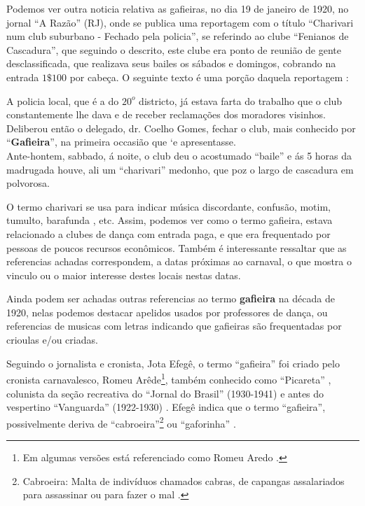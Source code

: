Podemos ver outra noticia relativa as gafieiras, no dia 19 de janeiro de 1920, 
no jornal ``A Razão'' (RJ), onde se
publica uma reportagem com o título 
``Charivari num club suburbano - Fechado pela policia'',
se referindo ao clube ``Fenianos de Cascadura'',
que seguindo o descrito, este clube era 
ponto de reunião de gente desclassificada, 
que realizava seus bailes os sábados e domingos,
cobrando na entrada $1\$100$ por cabeça.
O seguinte texto é uma porção daquela reportagem \cite[pp. 4]{oldgafieira4} \cite[pp. 629]{spielmann2016reflexoes}:
\begin{citando}
A policia local, que é a do $20^o$ districto,
já estava farta do trabalho que o club 
constantemente lhe dava e de receber reclamações 
dos moradores visinhos.\\
Deliberou então o delegado, dr. Coelho
Gomes, fechar o club, mais conhecido por 
``\textbf{Gafieira}'', na primeira occasião que `e apresentasse.\\
Ante-hontem, sabbado, á noite, o club 
deu o acostumado ``baile'' e ás 5 horas da 
madrugada houve, ali um ``charivari'' medonho,
que poz o largo de cascadura em polvorosa. 
\end{citando}
O termo charivari se usa para indicar música discordante, 
confusão, motim, tumulto, barafunda \cite[pp. 53]{almeida1996dicionario}, etc.
Assim, podemos ver como o termo gafieira, 
estava relacionado a clubes de dança com entrada paga,
e que era frequentado por pessoas de poucos recursos econômicos. 
Também é interessante ressaltar que as referencias achadas correspondem,
a datas próximas ao carnaval, o que mostra o vinculo ou o maior interesse 
destes locais nestas datas. 

Ainda podem ser achadas outras referencias ao termo \textbf{gafieira} na década de 1920,
nelas podemos destacar apelidos usados por professores de dança,
ou referencias de musicas com letras indicando que gafieiras 
são frequentadas por crioulas e/ou criadas.



Seguindo o  jornalista e cronista, Jota Efegê, %
o termo ``gafieira'' foi criado pelo cronista carnavalesco, 
Romeu Arêde\footnote{Em algumas versões está  referenciado como Romeu Aredo \cite[pp. 188]{raca1999}.}, 
também conhecido como ``Picareta'' \cite[pp. 3 - cad. 3]{juliosimoes} 
\cite[pp. 21]{efege1974maxixe} \cite[pp. 78]{coutinho2006cronistas}, 
colunista da seção recreativa do ``Jornal do Brasil'' (1930-1941) 
e antes do vespertino ``Vanguarda'' (1922-1930) \cite[pp. 58-59]{efege1982figuras} 
\cite[pp. 6 - cad. B]{entrevistajuliojournalbrasil1}.
Efegê indica que o termo ``gafieira'', possivelmente deriva de 
``cabroeira''\footnote{Cabroeira: Malta de indivíduos chamados cabras, 
de capangas assalariados para assassinar ou para fazer o mal \cite{diciocabroeira}.} 
ou ``gaforinha'' \cite[pp. 3 - cad. 3]{juliosimoes}.

